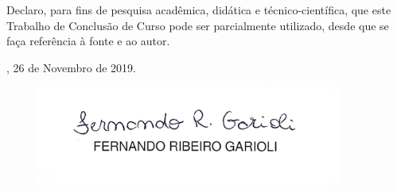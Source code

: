 \begin{declaracaodoautor}

  \vspace*{1.5cm}

  Declaro, para fins de pesquisa acadêmica, didática e
  técnico-científica, que este Trabalho de Conclusão de Curso pode ser
  parcialmente utilizado, desde que se faça referência à fonte e ao
  autor.

  \vspace*{2.5cm}

  \centering

  \imprimirlocal, 26 de Novembro de 2019.

  \vspace*{2.5cm}
  
  \begin{figure}[H]
    \centering %
    \advance\rightskip-0.5cm
    \includegraphics[width=10cm]{resources/declaracao.png} %
  \end{figure}


  \vspace*{\fill}
  
\end{declaracaodoautor}
